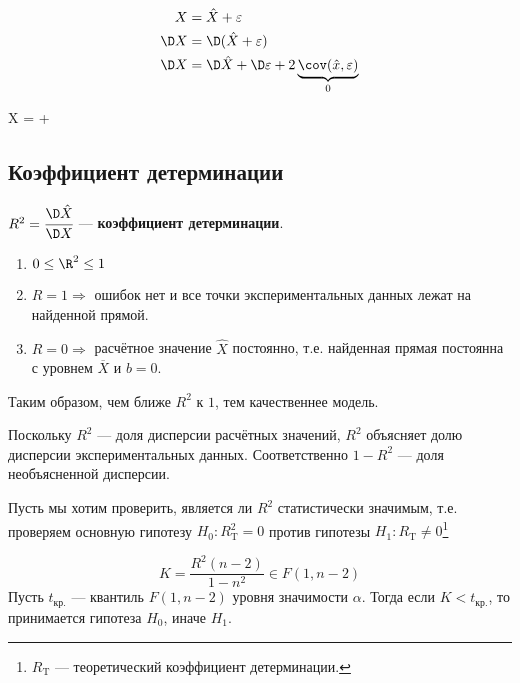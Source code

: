 \begin{align*}
    X    & = \hat{X} + \varepsilon                                                     \\
    \D X & = \D (\hat{X} + \varepsilon)                                                \\
    \D X & = \D \hat{X} + \D \varepsilon + 2 \underbrace{\cov(\hat{x}, \varepsilon)}_0
\end{align*}
\begin{myemph}
    \D X = \D {} + \D \varepsilon
\end{myemph}

\subsection{Коэффициент детерминации}

\begin{definition}
    \(R^2 = \cfrac{\D \hat{X}}{\D X}\) --- \textbf{коэффициент детерминации}.
\end{definition}
\begin{prop}\itemfix
    \begin{enumerate}
        \item \(0 \leq \R^2 \leq 1\)
        \item \(R = 1 \Rightarrow\) ошибок нет и все точки экспериментальных данных лежат на найденной прямой.
        \item \(R = 0 \Rightarrow\) расчётное значение \(\hat{X}\) постоянно, т.е. найденная прямая постоянна с уровнем \(\overline{X}\) и \(b = 0\).
    \end{enumerate}
\end{prop}

Таким образом, чем ближе \(R^2\) к \(1\), тем качественнее модель.

Поскольку \(R^2\) --- доля дисперсии расчётных значений, \(R^2\) объясняет долю дисперсии экспериментальных данных. Соответственно \(1 - R^2\) --- доля необъясненной дисперсии.

Пусть мы хотим проверить, является ли \(R^2\) статистически значимым, т.е. проверяем основную гипотезу \(H_0 : R^2_{\mathrm{T}} = 0\) против гипотезы \(H_1 : R_{\mathrm{T}} \neq 0\)\footnote{\(R_{\mathrm{T}}\) --- теоретический коэффициент детерминации.}

\begin{theorem}
    \[K = \frac{R^2(n - 2)}{1 - n^2} \in F(1, n - 2)\]
    Пусть \(t_{\text{кр.}}\) --- квантиль \(F(1, n - 2)\) уровня значимости \(\alpha\). Тогда если \(K < t_{\text{кр.}}\), то принимается гипотеза \(H_0\), иначе \(H_1\).
\end{theorem}

